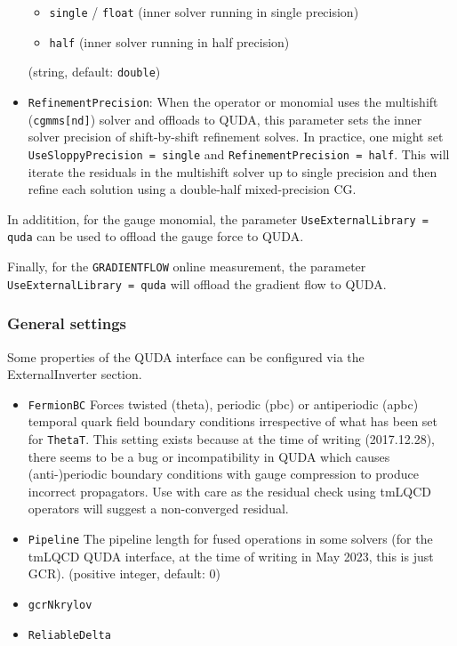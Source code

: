 \begin{itemize}
\begin{itemize}
      \item \texttt{single} / \texttt{float} (inner solver running in single precision)
      \item \texttt{half} (inner solver running in half precision)
    \end{itemize}
    (string, default: \texttt{double})
  \item \texttt{RefinementPrecision}: When the operator or monomial uses the multishift (\texttt{cgmms[nd]}) solver and offloads to QUDA, this parameter sets the inner solver precision of shift-by-shift refinement solves. In practice, one might set \texttt{UseSloppyPrecision = single} and \texttt{RefinementPrecision = half}. This will iterate the residuals in the multishift solver up to single precision and then refine each solution using a double-half mixed-precision CG.
\end{itemize}

In additition, for the gauge monomial, the parameter \texttt{UseExternalLibrary = quda} can be used to offload the gauge force to QUDA.

Finally, for the \texttt{GRADIENTFLOW} online measurement, the parameter \texttt{UseExternalLibrary = quda} will offload the gradient flow to QUDA.

\subsubsection{General settings}
Some properties of the QUDA interface can be configured via the {\ttfamily ExternalInverter} section.
\begin{itemize}
  \item \texttt{FermionBC} Forces twisted ({\ttfamily theta}), periodic ({\ttfamily pbc}) or antiperiodic ({\ttfamily apbc}) temporal quark field boundary conditions irrespective of what has been set for \texttt{ThetaT}. This setting exists because at the time of writing (2017.12.28), there seems to be a bug or incompatibility in QUDA which causes (anti-)periodic boundary conditions with gauge compression to produce incorrect propagators. Use with care as the residual check using tmLQCD operators will suggest a non-converged residual.
  \item \texttt{Pipeline} The pipeline length for fused operations in some solvers (for the tmLQCD QUDA interface, at the time of writing in May 2023, this is just GCR). (positive integer, default: $0$)
  \item \texttt{gcrNkrylov} 
  \item \texttt{ReliableDelta}
\end{itemize}

